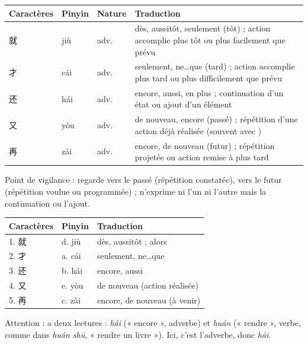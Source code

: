 \documentclass[11pt]{article}
\newcommand{\cle}[1]{{\popxbold\color{popdark}#1}}
\newcommand{\zh}[1]{\ifmmode\text{#1}\else{#1}\fi}
\begin{document}
\begin{corrige}

\begin{center}
\begin{tabularx}{\linewidth}{|X|X|X|X|}
\hline
\rowcolor{popblueL} Caractères & Pinyin & Nature & Traduction \\
\hline
就 & jiù & adv. & dès, aussitôt, seulement (tôt) ; action accomplie plus tôt ou plus facilement que prévu \\
\hline
才 & cái & adv. & seulement, ne\ldots que (tard) ; action accomplie plus tard ou plus difficilement que prévu \\
\hline
还 & hái & adv. & encore, aussi, en plus ; continuation d'un état ou ajout d'un élément \\
\hline
又 & yòu & adv. & de nouveau, encore (passé) ; répétition d'une action déjà réalisée (souvent avec \zh{了}) \\
\hline
再 & zài & adv. & encore, de nouveau (futur) ; répétition projetée ou action remise à plus tard \\
\hline
\end{tabularx}
\end{center}

\cle{Point de vigilance} : \zh{又} regarde vers le passé (répétition constatée), \zh{再} vers le futur (répétition voulue ou programmée) ; \zh{还} n'exprime ni l'un ni l'autre mais la continuation ou l'ajout.
\end{corrige}

\begin{corrige}

\begin{center}
\begin{tabularx}{\linewidth}{|X|X|X|}
\hline
\rowcolor{popblueL} Caractères & Pinyin & Traduction \\
\hline
1. 就 & d. jiù & dès, aussitôt ; alors \\
\hline
2. 才 & a. cái & seulement, ne\ldots que \\
\hline
3. 还 & b. hái & encore, aussi \\
\hline
4. 又 & e. yòu & de nouveau (action réalisée) \\
\hline
5. 再 & c. zài & encore, de nouveau (à venir) \\
\hline
\end{tabularx}
\end{center}

\cle{Attention} : \zh{还} a deux lectures : \emph{hái} (« encore », adverbe) et \emph{huán} (« rendre », verbe, comme dans \zh{还书} \emph{huán shū}, « rendre un livre »). Ici, c'est l'adverbe, donc \emph{hái}.
\end{corrige}
\end{document}
